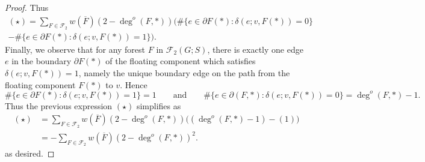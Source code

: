 \documentclass{amsart}
\theoremstyle{definition}
\newcommand{\forests}{\mathcal{F}}
\newcommand{\degout}{\deg^o}
\begin{document}
\begin{proof}
Thus
\begin{multline}
	(\star) = \sum_{F \in \forests_2} w(\overline{F}) (2 - \degout(F,*))  \Bigg( \#\{e \in \partial F(*) : \delta(e; v, F(*)) = 0 \}  \\
	- \#\{e \in \partial F(*) : \delta(e; v, F(*)) = 1 \}  \Bigg).
\end{multline}
Finally, we observe that for any forest $F$ in $\forests_2(G;S)$,
there is exactly one edge $e$ in the boundary $\partial F(*)$ of the floating component which satisfies $\delta(e; v, F(*)) = 1$, namely the unique boundary edge on the path from the floating component $F(*)$ to $v$.
Hence
\[
	\#\{e \in \partial F(*) : \delta(e;v, F(*)) = 1 \} = 1
\qquad\text{and}\qquad
	\#\{e \in \partial (F,*) : \delta(e;v, F(*)) = 0 \} = \degout(F,*) - 1 .
\]
Thus the previous expression $(\star)$ simplifies as
\begin{align*}
	(\star) &= \sum_{F \in \forests_2} w(\overline{F}) (2 - \degout(F,*))  \Big( (\degout(F,*) - 1)  - (1) \Big) \\
	&= - \!\sum_{F \in \forests_2} w(\overline{F}) (2 - \degout(F,*))^2 .
\end{align*}
as desired.
\end{proof}
\end{document}
